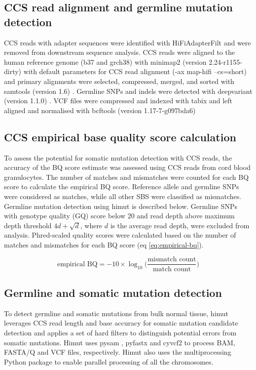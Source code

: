 \subsection{CCS read alignment and germline mutation detection}
CCS reads with adapter sequences were identified with HiFiAdapterFilt \cite{Sim2022-pi} and were removed from downstream sequence analysis. CCS reads were aligned to the human reference genome (b37 and grch38) with minimap2 (version 2.24-r1155-dirty) with default parameters for CCS read alignment (-ax map-hifi --cs=short) \cite{Li2018-am} and primary alignments were selected, compressed, merged, and sorted with samtools (version 1.6) \cite{Li2009-qp}. Germline SNPs and indels were detected with deepvariant (version 1.1.0) \cite{Poplin2018-ub}. VCF files were compressed and indexed with tabix \cite{Li2011-zj} and left aligned and normalised with bcftools (version 1.17-7-g097bda6) \cite{Li2011-ag}


\subsection{CCS empirical base quality score calculation}

To assess the potential for somatic mutation detection with CCS reads, the accuracy of the BQ score estimate was assessed using CCS reads from cord blood granulocytes. The number of matches and mismatches were counted for each BQ score to calculate the empirical BQ score. Reference allele and germline SNPs were considered as matches, while all other SBS were classified as mismatches. Germline mutation detection using himut is described below. Germline SNPs with genotype quality (GQ) score below 20 and read depth above maximum depth threshold $4d + \sqrt{d}$, where $d$ is the average read depth, were excluded from analysis. Phred-scaled quality scores were calculated based on the number of matches and mismatches for each BQ score (eq \ref{eq:empirical-bq}).

\begin{equation} \label{eq:empirical-bq}
\text{empirical BQ} = -10 \times \log_{10} \Big( \frac{\text{mismatch count}}{\text{match count}} \Big)
\end{equation}

\subsection{Germline and somatic mutation detection}

To detect germline and somatic mutations from bulk normal tissue, himut leverages CCS read length and base accuracy for somatic mutation candidate detection and applies a set of hard filters to distinguish potential errors from somatic mutations. Himut uses pysam \cite{pysam}, pyfastx \cite{Du2021-ya} and cyvcf2 \cite{Pedersen2017-ld} to process BAM, FASTA/Q and VCF files, respectively. Himut also uses the multiprocessing Python package \cite{multiprocessing} to enable parallel processing of all the chromosomes. 

